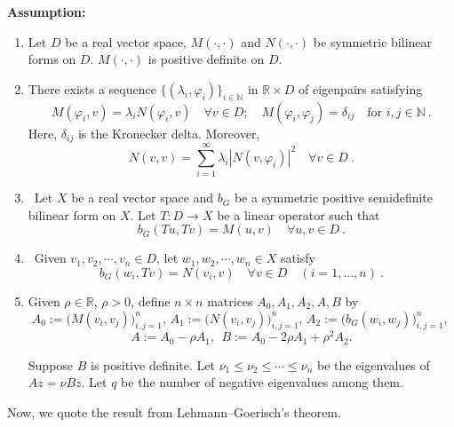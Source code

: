 \documentclass[a4,11pt]{article}
\numberwithin{equation}{section}
\begin{document}
\medskip


{\bf Assumption:}
\begin{enumerate}
 \item [A1]
  Let $D$ be a real vector space, $M(\cdot, \cdot)$ and $N(\cdot,\cdot)$ be symmetric bilinear forms on  $D$. $M(\cdot, \cdot)$ is positive definite on $D$.
 \item[A2] There exists a sequence $\{ (\lambda_i, \varphi_i)\}_{i\in \mathbb{N}}$ in $\mathbb{R}\times D$ of eigenpairs satisfying 
 $$
 M(\varphi_i, v) =\lambda_i  N(\varphi_i,v)\quad  \forall v\in D;\quad
M(\varphi_i,\varphi_j )=\delta_{ij} \quad \text{for } i,j\in\mathbb{N}~.
 $$
 Here, $\delta_{ij}$ is the Kronecker delta.
 Moreover, 
 \begin{equation}
N(v,v) = \sum\limits_{i=1}^\infty \lambda_i\left| N(v,\varphi_i) \right|^2 \quad \forall v\in D~.
 \end{equation}


\item[A3] ~Let $X$ be a real vector space and $b_G$ be a symmetric positive semidefinite bilinear form on $X$. Let $T:D\rightarrow X$ be a linear operator such that
\begin{equation*}	
b_G(Tu,Tv)=M(u, v)\quad\forall u,v\in D~.
\end{equation*}
\item [A4] ~Given   $v_1, v_2, \cdots, v_n\in D$, let $w_1, w_2, \cdots, w_n \in X$ satisfy
\begin{equation}
	\label{eq:Lehmann--Goerisch-v-to-w}
b_G(w_i, T v)=N(v_i,v)\quad \forall v  \in D \quad (i=1,\dots,n)~.
\end{equation}
\item [A5] Given $\rho\in\mathbb{R}$, $\rho>0$,
define $n\times n$ matrices $A_0, A_1, A_2, A, B$ by
$$
A_0 \!:= \big(M(v_i,v_j)\big)_{i,j=1}^n, \,
A_1 \!:= \big(N(v_i,v_j)\big)_{i,j=1}^n, \,
A_2 \!:= \big(b_G(w_i,w_j)\big)_{i,j=1}^n, \, 
$$
\begin{equation}
\label{eq:A-B-in-LH-Thm}
A := A_0-\rho A_1, ~~ B := A_0-2\rho A_1 + \rho^2 A_2.
\end{equation}

Suppose $B$ is positive definite. Let $\nu_1 \le \nu_2 \le \cdots \le \nu_n$ be the eigenvalues of $Az=\nu Bz$. 
Let $q$ be the number of negative eigenvalues among them. 
\end{enumerate}

\medskip

Now, we quote the result from Lehmann--Goerisch's theorem.
\end{document}
